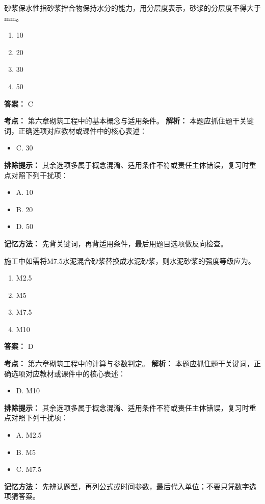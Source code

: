 \documentclass[UTF8,fontset=fandol,11pt]{ctexart}
\begin{document}
\begin{quizbox}[title={第 5 题}]
砂浆保水性指砂浆拌合物保持水分的能力，用分层度表示，砂浆的分层度不得大于 mm。\\
\begin{enumerate}[label=\Alph*.]
\item 10
\item 20
\item 30
\item 50
\end{enumerate}
\textbf{答案：} C
\vspace{0.25em}
\begin{answerbox}[title={考点解析}]
\textbf{考点：} 第六章砌筑工程中的基本概念与适用条件。
\textbf{解析：} 本题应抓住题干关键词，正确选项对应教材或课件中的核心表述：
\begin{itemize}
\item C. 30
\end{itemize}
\textbf{排除提示：} 其余选项多属于概念混淆、适用条件不符或责任主体错误，复习时重点对照下列干扰项：
\begin{itemize}
\item A. 10
\item B. 20
\item D. 50
\end{itemize}
\textbf{记忆方法：} 先背关键词，再背适用条件，最后用题目选项做反向检查。
\end{answerbox}
\end{quizbox}

\begin{quizbox}[title={第 6 题}]
施工中如需将M7.5水泥混合砂浆替换成水泥砂浆，则水泥砂浆的强度等级应为。\\
\begin{enumerate}[label=\Alph*.]
\item M2.5
\item M5
\item M7.5
\item M10
\end{enumerate}
\textbf{答案：} D
\vspace{0.25em}
\begin{answerbox}[title={考点解析}]
\textbf{考点：} 第六章砌筑工程中的计算与参数判定。
\textbf{解析：} 本题应抓住题干关键词，正确选项对应教材或课件中的核心表述：
\begin{itemize}
\item D. M10
\end{itemize}
\textbf{排除提示：} 其余选项多属于概念混淆、适用条件不符或责任主体错误，复习时重点对照下列干扰项：
\begin{itemize}
\item A. M2.5
\item B. M5
\item C. M7.5
\end{itemize}
\textbf{记忆方法：} 先辨认题型，再列公式或时间参数，最后代入单位；不要只凭数字选项猜答案。
\end{answerbox}
\end{quizbox}
\end{document}
